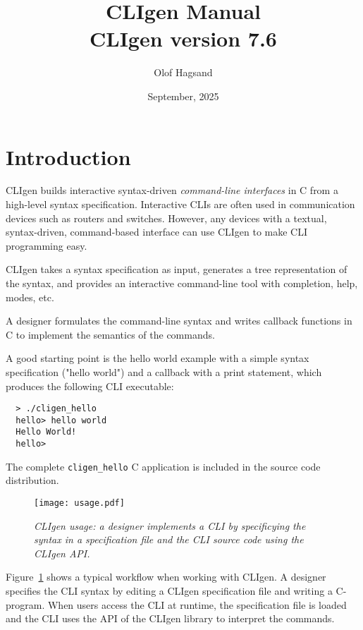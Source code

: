 \documentclass[a4paper, 10pt] {article}
\title {CLIgen Manual\\ {\small CLIgen version 7.6}}
\author{Olof Hagsand}
\begin{document}
\date{September, 2025}
\maketitle
\setcounter{tocdepth}{2}
\tableofcontents
\newpage
\section{Introduction}
\label{sec:intro}

CLIgen builds interactive syntax-driven \emph{command-line interfaces}
in C from a high-level syntax specification. Interactive CLIs are
often used in communication devices such as routers and
switches. However, any devices with a textual, syntax-driven,
command-based interface can use CLIgen to make CLI programming easy.

CLIgen takes a syntax specification as input, generates a tree
representation of the syntax, and provides an interactive command-line
tool with completion, help, modes, etc.

A designer formulates the command-line syntax and writes callback
functions in C to implement the semantics of the commands.

A good starting point is the hello world example with a simple syntax
specification ("hello world") and a callback with a print statement,
which produces the following CLI executable:

\begin{verbatim}
  > ./cligen_hello 
  hello> hello world 
  Hello World!
  hello> 
\end{verbatim}

The complete {\tt cligen\_hello} C application is included in the
source code distribution.

\begin{figure}
\centering
\texttt{[image: usage.pdf]}
\caption{\em CLIgen usage: a designer implements a CLI by specificying the syntax in a specification file and the CLI source code using the CLIgen API.}
\label{fig:usage}
\end{figure}

Figure~\ref{fig:usage} shows a typical workflow when working with
CLIgen. A designer specifies the CLI syntax by editing a CLIgen
specification file and writing a C-program. When users access the CLI
at runtime, the specification file is loaded and the CLI uses the API
of the CLIgen library to interpret the commands.
\end{document}

